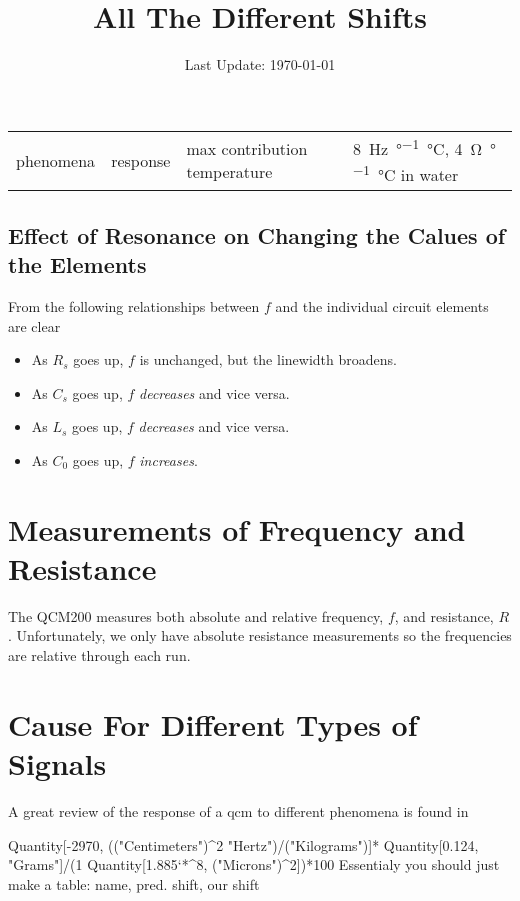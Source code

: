 \documentclass[a4paper]{article}
\begin{document}
\title{All The Different Shifts}
\date{Last Update: \today}
\maketitle
\tableofcontents

\begin{table}
  \begin{tabularx}{\textwidth}{ll}
    \toprule
    phenomena   & response & max contribution
    \midrule
    temperature &
    \SI{8}{\hertz\per\degree\celsius}, \SI{4}{\ohm\per\degree\celsius} in water\cite{srsqcm}
    \bottomrule
  \end{tabularx}
\end{table}

\subsection{Effect of Resonance on Changing the Calues of the Elements}
From  the following relationships between $f$ and
the individual circuit elements are clear
\begin{itemize}
  \item As $R_s$ goes up, $f$ is unchanged, but the linewidth broadens.
  \item As $C_s$ goes up, $f$ \textit{decreases} and vice versa.
  \item As $L_s$ goes up, $f$ \textit{decreases} and vice versa.
  \item As $C_0$ goes up, $f$ \textit{increases}.
\end{itemize}

\section{Measurements of Frequency and Resistance}
The QCM200 measures both absolute and relative frequency, $f$, and
resistance, $R$.  Unfortunately, we only have absolute resistance
measurements so the frequencies are relative through each run.

\section{Cause For Different Types of Signals}
A great review of the response of a \gls{qcm} to different phenomena is found in \cite{walls1995fundamental}

Quantity[-2970, (("Centimeters")^2 "Hertz")/("Kilograms")]*
Quantity[0.124, "Grams"]/(1 Quantity[1.885`*^8, ("Microns")^2])*100
Essentialy you should just make a table: name, pred. shift, our shift
\end{document}
